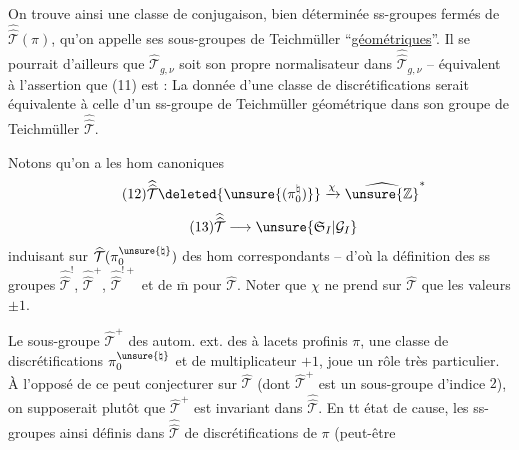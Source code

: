 On trouve ainsi une classe de conjugaison, bien déterminée 
ss-groupes fermés de $\widehat{\widehat{\mathcal{T}}}(\pi)$,
qu'on appelle ses sous-groupes de Teichmüller ``\uline{géométriques}''.
Il se pourrait d'ailleurs que $\widehat{\mathcal{T}}_{g,\nu}$ soit
son propre normalisateur dans $\widehat{\widehat{\mathcal{T}}}_{g,\nu}$
-- équivalent à l'assertion que (11) est  :
La donnée d'une classe de discrétifications
serait équivalente à celle d'un ss-groupe de Teichmüller géométrique dans
son groupe de Teichmüller  $\widehat{\widehat{\mathcal{T}}}$.



Notons qu'on a les hom canoniques
\[
\tag{12}
\widehat{\widehat{\mathcal{T}}}\deleted{\unsure{(\pi_0^{\natural})}}
\xrightarrow{\chi}\widehat{\unsure{\mathbb{Z}}}^{*}
\]
\[
\tag{13}
\widehat{\widehat{\mathcal{T}}}\longrightarrow
\unsure{\mathfrak{S}_{I}|\mathcal{G}_{I}}
\]
induisant sur $\widehat{\mathcal{T}}(\pi_0^{\unsure{\natural}})$ des
 hom correspondants -- d'où la définition des
ss groupes $\widehat{\widehat{\mathcal{T}}}^{!}$,
$\widehat{\widehat{\mathcal{T}}}^{+}$,
$\widehat{\widehat{\mathcal{T}}}^{!+}$ et de $\overline{\mathrm m}$ pour
$\widehat{\mathcal{T}}$. Noter que $\chi$ ne prend sur $\widehat{\mathcal{T}}$
que les valeurs $\pm1$.

Le sous-groupe $\widehat{\mathcal{T}}^{+}$ des autom. ext. des
 à lacets profinis $\pi$,
 une classe de discrétifications
$\pi_0^{\unsure{\natural}}$ et de multiplicateur $+1$, joue un rôle très particulier.
À l'opposé de ce  peut conjecturer sur $\widehat{\mathcal{T}}$
(dont $\widehat{\mathcal{T}}^{+}$ est un sous-groupe  d'indice $2$),
on supposerait plutôt que $\widehat{\mathcal{T}}^{+}$ est invariant dans
$\widehat{\widehat{\mathcal{T}}}$. En tt état de cause,
les ss-groupes ainsi définis dans $\widehat{\widehat{\mathcal{T}}}$
  de discrétifications de $\pi$
 (peut-être


